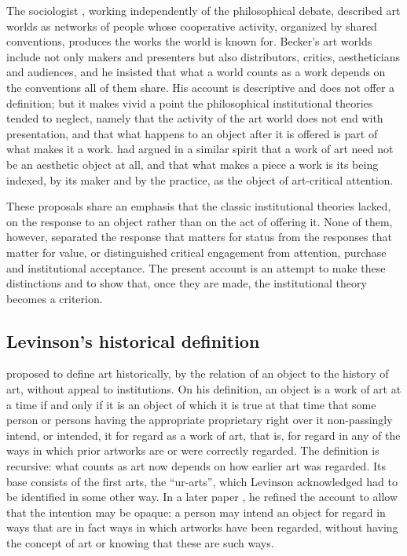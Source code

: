 \documentclass{situationist-preprint}
\begin{document}
The sociologist \citet{Becker1982}, working independently of the philosophical debate, described art worlds as networks of people whose cooperative activity, organized by shared conventions, produces the works the world is known for. Becker's art worlds include not only makers and presenters but also distributors, critics, aestheticians and audiences, and he insisted that what a world counts as a work depends on the conventions all of them share. His account is descriptive and does not offer a definition; but it makes vivid a point the philosophical institutional theories tended to neglect, namely that the activity of the art world does not end with presentation, and that what happens to an object after it is offered is part of what makes it a work. \citet{Binkley1977} had argued in a similar spirit that a work of art need not be an aesthetic object at all, and that what makes a piece a work is its being indexed, by its maker and by the practice, as the object of art-critical attention.

These proposals share an emphasis that the classic institutional theories lacked, on the response to an object rather than on the act of offering it. None of them, however, separated the response that matters for status from the responses that matter for value, or distinguished critical engagement from attention, purchase and institutional acceptance. The present account is an attempt to make these distinctions and to show that, once they are made, the institutional theory becomes a criterion.

\subsection{Levinson's historical definition}

\citet{Levinson1979} proposed to define art historically, by the relation of an object to the history of art, without appeal to institutions. On his definition, an object is a work of art at a time if and only if it is an object of which it is true at that time that some person or persons having the appropriate proprietary right over it non-passingly intend, or intended, it for regard as a work of art, that is, for regard in any of the ways in which prior artworks are or were correctly regarded. The definition is recursive: what counts as art now depends on how earlier art was regarded. Its base consists of the first arts, the \enquote{ur-arts}, which Levinson acknowledged had to be identified in some other way. In a later paper \citep{Levinson1989}, he refined the account to allow that the intention may be opaque: a person may intend an object for regard in ways that are in fact ways in which artworks have been regarded, without having the concept of art or knowing that these are such ways.
\end{document}
